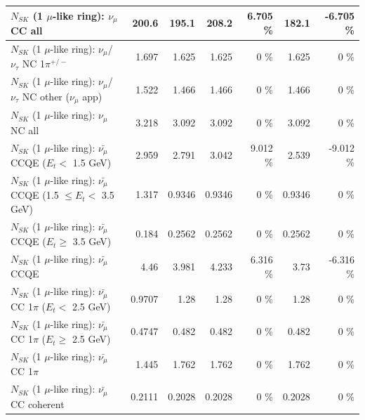 \begin{table}
\begin{tabular}{| l | r | r | r  r | r  r |}
                                $N_{SK}$ (1 $\mu$-like ring): $\nu_{\mu}$ CC all &           200.6 &           195.1 &           208.2 &    6.705 \%  &           182.1 &   -6.705 \%  \\ 
\hline
              $N_{SK}$ (1 $\mu$-like ring): $\nu_\mu$/$\nu_\tau$ NC 1$\pi^{+/-}$ &           1.697 &           1.625 &           1.625 &        0 \%  &           1.625 &        0 \%  \\ 
     $N_{SK}$ (1 $\mu$-like ring): $\nu_\mu$/$\nu_\tau$ NC other ($\nu_\mu$ app) &           1.522 &           1.466 &           1.466 &        0 \%  &           1.466 &        0 \%  \\ 
                                $N_{SK}$ (1 $\mu$-like ring): $\nu_{\mu}$ NC all &           3.218 &           3.092 &           3.092 &        0 \%  &           3.092 &        0 \%  \\ 
\hline
\hline
\hline
          $N_{SK}$ (1 $\mu$-like ring): $\bar{\nu_\mu}$ CCQE ($E_{t} <$ 1.5 GeV) &           2.959 &           2.791 &           3.042 &    9.012 \%  &           2.539 &   -9.012 \%  \\ 
 $N_{SK}$ (1 $\mu$-like ring): $\bar{\nu_\mu}$ CCQE (1.5 $\leq E_{t} <$ 3.5 GeV) &           1.317 &          0.9346 &          0.9346 &        0 \%  &          0.9346 &        0 \%  \\ 
       $N_{SK}$ (1 $\mu$-like ring): $\bar{\nu_\mu}$ CCQE ($E_{t} \geq$ 3.5 GeV) &           0.184 &          0.2562 &          0.2562 &        0 \%  &          0.2562 &        0 \%  \\ 
\hline
                              $N_{SK}$ (1 $\mu$-like ring): $\bar{\nu_\mu}$ CCQE &            4.46 &           3.981 &           4.233 &    6.316 \%  &            3.73 &   -6.316 \%  \\ 
\hline
     $N_{SK}$ (1 $\mu$-like ring): $\bar{\nu_\mu}$ CC 1$\pi$ ($E_{t} <$ 2.5 GeV) &          0.9707 &            1.28 &            1.28 &        0 \%  &            1.28 &        0 \%  \\ 
  $N_{SK}$ (1 $\mu$-like ring): $\bar{\nu_\mu}$ CC 1$\pi$ ($E_{t} \geq$ 2.5 GeV) &          0.4747 &           0.482 &           0.482 &        0 \%  &           0.482 &        0 \%  \\ 
\hline
                         $N_{SK}$ (1 $\mu$-like ring): $\bar{\nu_\mu}$ CC 1$\pi$ &           1.445 &           1.762 &           1.762 &        0 \%  &           1.762 &        0 \%  \\ 
                       $N_{SK}$ (1 $\mu$-like ring): $\bar{\nu_\mu}$ CC coherent &          0.2111 &          0.2028 &          0.2028 &        0 \%  &          0.2028 &        0 \%  \\ 

\end{tabular}
\end{table}
